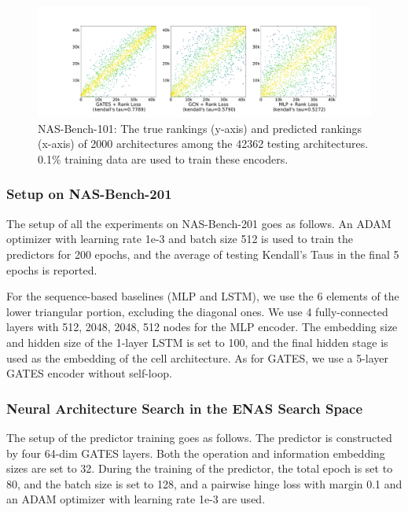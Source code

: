 \documentclass[runningheads]{llncs}
\begin{document}
\begin{figure}[bt]
\includegraphics[width=1.\linewidth]{figs/nb101_sactter.pdf}
\caption{NAS-Bench-101: The true rankings (y-axis) and predicted rankings (x-axis) of 2000 architectures among the 42362 testing architectures. 0.1\% training data are used to train these encoders.}
\label{fig:scatter-nb101}
\end{figure}

\subsubsection{Setup on NAS-Bench-201}
The setup of all the experiments on NAS-Bench-201 goes as follows. An ADAM optimizer with learning rate 1e-3 and batch size 512 is used to train the predictors for 200 epochs, and the average of testing Kendall's Taus in the final 5 epochs is reported.

For the sequence-based baselines (MLP and LSTM), we use the 6 elements of the lower triangular portion, excluding the diagonal ones. We use 4 fully-connected layers with 512, 2048, 2048, 512 nodes for the MLP encoder. The embedding size and hidden size of the 1-layer LSTM is set to 100, and the final hidden stage is used as the embedding of the cell architecture. As for GATES, we use a 5-layer GATES encoder without self-loop.


\subsubsection{Neural Architecture Search in the ENAS Search Space}

The setup of the predictor training goes as follows. The predictor is constructed by four 64-dim GATES layers. Both the operation and information embedding sizes are set to 32. During the training of the predictor, the total epoch is set to 80, and the batch size is set to 128, and a pairwise hinge loss with margin 0.1 and an ADAM optimizer with learning rate 1e-3 are used.
\end{document}
